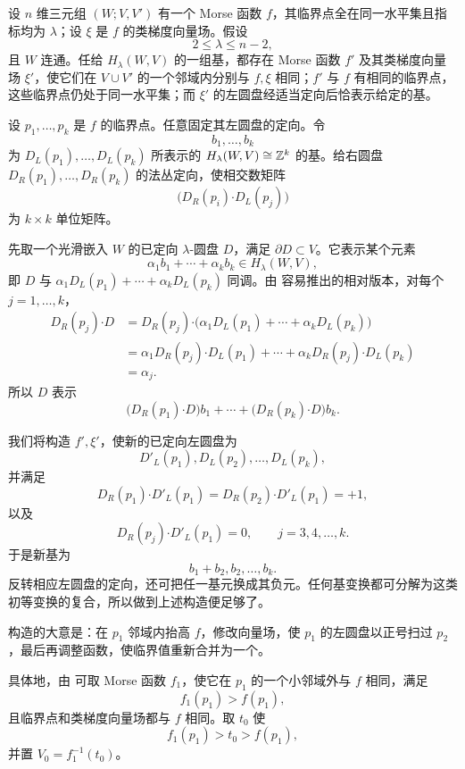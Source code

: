 设 $n$ 维三元组 $(W;V,V')$ 有一个 Morse 函数 $f$，其临界点全在同一水平集且指标均为 $\lambda$；设 $\xi$ 是 $f$ 的类梯度向量场。假设
\[
  2\leq\lambda\leq n-2,
\]
且 $W$ 连通。任给 $H_\lambda(W,V)$ 的一组基，都存在 Morse 函数 $f'$ 及其类梯度向量场 $\xi'$，使它们在 $V\cup V'$ 的一个邻域内分别与 $f,\xi$ 相同；$f'$ 与 $f$ 有相同的临界点，这些临界点仍处于同一水平集；而 $\xi'$ 的左圆盘经适当定向后恰表示给定的基。

\Proof 设 $p_1,\ldots,p_k$ 是 $f$ 的临界点。任意固定其左圆盘的定向。令
\[
  b_1,\ldots,b_k
\]
为 $D_L(p_1),\ldots,D_L(p_k)$ 所表示的 $H_\lambda(W,V)\cong\mathbb{Z}^k$ 的基。给右圆盘 $D_R(p_1),\ldots,D_R(p_k)$ 的法丛定向，使相交数矩阵
\[
  \bigl(D_R(p_i)\mathbin{\boldsymbol\cdot}D_L(p_j)\bigr)
\]
为 $k\times k$ 单位矩阵。

先取一个光滑嵌入 $W$ 的已定向 $\lambda$-圆盘 $D$，满足 $\partial D\subset V$。它表示某个元素
\[
  \alpha_1b_1+\cdots+\alpha_kb_k\in H_\lambda(W,V),
\]
即 $D$ 与 $\alpha_1D_L(p_1)+\cdots+\alpha_kD_L(p_k)$ 同调。由 容易推出的相对版本，对每个 $j=1,\ldots,k$，
\begin{align*}
  D_R(p_j)\mathbin{\boldsymbol\cdot}D
  &=D_R(p_j)\mathbin{\boldsymbol\cdot}
    \bigl(\alpha_1D_L(p_1)+\cdots+\alpha_kD_L(p_k)\bigr)\\
  &=\alpha_1D_R(p_j)\mathbin{\boldsymbol\cdot}D_L(p_1)
    +\cdots+
    \alpha_kD_R(p_j)\mathbin{\boldsymbol\cdot}D_L(p_k)\\
  &=\alpha_j.
\end{align*}
所以 $D$ 表示
\[
  \bigl(D_R(p_1)\mathbin{\boldsymbol\cdot}D\bigr)b_1
  +\cdots+
  \bigl(D_R(p_k)\mathbin{\boldsymbol\cdot}D\bigr)b_k.
\]

我们将构造 $f',\xi'$，使新的已定向左圆盘为
\[
  D'_L(p_1),D_L(p_2),\ldots,D_L(p_k),
\]
并满足
\[
  D_R(p_1)\mathbin{\boldsymbol\cdot}D'_L(p_1)
  =D_R(p_2)\mathbin{\boldsymbol\cdot}D'_L(p_1)=+1,
\]
以及
\[
  D_R(p_j)\mathbin{\boldsymbol\cdot}D'_L(p_1)=0,
  \qquad j=3,4,\ldots,k.
\]
于是新基为
\[
  b_1+b_2,b_2,\ldots,b_k.
\]
反转相应左圆盘的定向，还可把任一基元换成其负元。任何基变换都可分解为这类初等变换的复合，所以做到上述构造便足够了。

构造的大意是：在 $p_1$ 邻域内抬高 $f$，修改向量场，使 $p_1$ 的左圆盘以正号扫过 $p_2$，最后再调整函数，使临界值重新合并为一个。

具体地，由 可取 Morse 函数 $f_1$，使它在 $p_1$ 的一个小邻域外与 $f$ 相同，满足
\[
  f_1(p_1)>f(p_1),
\]
且临界点和类梯度向量场都与 $f$ 相同。取 $t_0$ 使
\[
  f_1(p_1)>t_0>f(p_1),
\]
并置 $V_0=f_1^{-1}(t_0)$。

